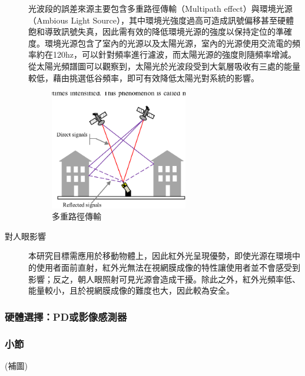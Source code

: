 \begin{description}
        光波段的誤差來源主要包含多重路徑傳輸（Multipath effect）與環境光源（Ambious Light Source），其中環境光強度過高可造成訊號偏移甚至硬體飽和導致訊號失真，因此需有效的降低環境光源的強度以保持定位的準確度。環境光源包含了室內的光源以及太陽光源，室內的光源使用交流電的頻率約在120hz，可以針對頻率進行濾波，而太陽光源的強度則隨頻率增減。從太陽光頻譜圖可以觀察到，太陽光於光波段受到大氣層吸收有三處的能量較低，藉由挑選低谷頻率，即可有效降低太陽光對系統的影響。

        \begin{figure}[ht]
            \centering
            \includegraphics[width=6cm]{ch2pic/multipath.png}
            \caption{多重路徑傳輸\cite{pic:multipath}}
            \label{pic:multipath}
        \end{figure}

        \item[對人眼影響]\hfill 

        本研究目標需應用於移動物體上，因此紅外光呈現優勢，即使光源在環境中的使用者面前直射，紅外光無法在視網膜成像的特性讓使用者並不會感受到影響；反之，朝人眼照射可見光源會造成干擾。除此之外，紅外光頻率低、能量較小，且於視網膜成像的難度也大，因此較為安全。

        \end{description}


        

        \subsubsection{硬體選擇：PD或影像感測器}



        \subsubsection{小節}
        \hspace*{\fill}
        
        (補圖)

